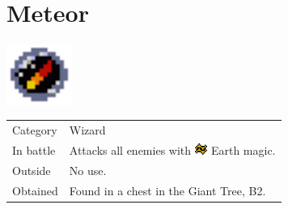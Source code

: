 \section{Meteor}
\label{spell:meteor}

\includegraphics[height=2cm,keepaspectratio]{./resources/spells/meteor}

\begin{longtable}{ l p{9cm} }
	Category
	& Wizard
\\ %
	In battle
	& Attacks all enemies with \includegraphics[height=1em,keepaspectratio]{./resources/effects/earth} Earth magic.
\\ %
	Outside
	& No use.
\\ %
	Obtained
	& Found in a chest in the Giant Tree, B2.
\end{longtable}
